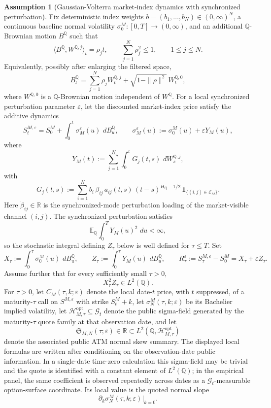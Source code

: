 \documentclass[11pt,a4paper]{amsart}
\theoremstyle{plain}
\theoremstyle{definition}
\newtheorem{assumption}[theorem]{Assumption}
\theoremstyle{remark}
\newcommand{\R}{\mathbb{R}}
\newcommand{\QQ}{\mathbb{Q}}
\newcommand{\EE}{\mathbb{E}}
\newcommand{\cG}{\mathcal{G}}
\newcommand{\cH}{\mathcal{H}}
\newcommand{\cE}{\mathcal{E}}
\newcommand{\one}{\mathbf{1}}
\newcommand{\dd}{\,d}
\begin{document}
\begin{assumption}[Gaussian-Volterra market-index dynamics with synchronized perturbation]\label{ass:q-index}
Fix deterministic index weights \(b=(b_1,\dots,b_N)\in(0,\infty)^N\), a continuous baseline normal
volatility \(\sigma_0^M\colon[0,T]\to(0,\infty)\), and an additional \(\QQ\)-Brownian motion
\(B^\QQ\) such that
\[
        \langle B^\QQ,W^{\QQ,j}\rangle_t=\rho_j t,
        \qquad
        \sum_{j=1}^N \rho_j^2\le 1,
        \qquad
        1\le j\le N.
\]
Equivalently, possibly after enlarging the filtered space,
\[
        B_t^\QQ
        =
        \sum_{j=1}^N \rho_j W_t^{\QQ,j}
        +
        \sqrt{1-\|\rho\|^2}\,W_t^{\QQ,0},
\]
where \(W^{\QQ,0}\) is a \(\QQ\)-Brownian motion independent of \(W^\QQ\).
For a local synchronized perturbation parameter \(\varepsilon\), let the discounted market-index
price satisfy the additive dynamics
\[
        S_t^{M,\varepsilon}
        =
        S_0^M
        +
        \int_0^t \sigma_M^\varepsilon(u)\,\dd B_u^\QQ,
        \qquad
        \sigma_M^\varepsilon(u):=\sigma_0^M(u)+\varepsilon Y_M(u),
\]
where
\[
        Y_M(t)
        :=
        \sum_{j=1}^N \int_0^t G_j(t,s)\,\dd W_s^{\QQ,j},
\]
with
\[
        G_j(t,s)
        :=
        \sum_{i=1}^N
        b_i\,\dot\beta_{ij}\,a_{ij}(t,s)\,(t-s)^{H_{ij}-1/2}\,
        \one_{\{(i,j)\in\cE_M\}}.
\]
Here \(\dot\beta_{ij}\in\R\) is the synchronized-mode perturbation loading of the market-visible
channel \((i,j)\).  The synchronized perturbation satisfies
\[
        \EE_\QQ\int_0^T Y_M(u)^2\,\dd u<\infty,
\]
so the stochastic integral defining \(Z_\tau\) below is well defined for \(\tau\le T\).
Set
\[
        X_\tau:=\int_0^\tau \sigma_0^M(u)\,\dd B_u^\QQ,
        \qquad
        Z_\tau:=\int_0^\tau Y_M(u)\,\dd B_u^\QQ,
        \qquad
        R_\tau^\varepsilon:=S_\tau^{M,\varepsilon}-S_0^M=X_\tau+\varepsilon Z_\tau.
\]
Assume further that for every sufficiently small \(\tau>0\),
\[
        X_\tau^2 Z_\tau\in L^2(\QQ).
\]
For \(\tau>0\), let \(C_M(\tau,k;\varepsilon)\) denote the local date-\(t\) price, with \(t\)
suppressed, of a maturity-\(\tau\) call on \(S^{M,\varepsilon}\) with strike \(S_t^M+k\), let
\(\sigma_N^M(\tau,k;\varepsilon)\) be its Bachelier implied volatility, let
\(\cH_{M,\tau}^{\mathrm{opt}}\subseteq \cG_t\) denote the public sigma-field generated by the
maturity-\(\tau\) quote family at that observation date, and let
\[
        \mathfrak S_{M,N}(\tau;\varepsilon)\in \R \subset L^2(\QQ,\cH_{M,\tau}^{\mathrm{opt}})
 \]
denote the associated public ATM normal skew summary.  The displayed local formulas are written
after conditioning on the observation-date public information.  In a single-date time-zero
calculation this sigma-field may be trivial and the quote is identified with a constant element of
\(L^2(\QQ)\); in the empirical panel, the same coefficient is observed repeatedly across dates as a
\(\cG_t\)-measurable option-surface coordinate.  Its local value is the quoted normal slope
\[
        \partial_k \sigma_N^M(\tau,k;\varepsilon)\big|_{k=0}.
\]
\end{assumption}
\end{document}
